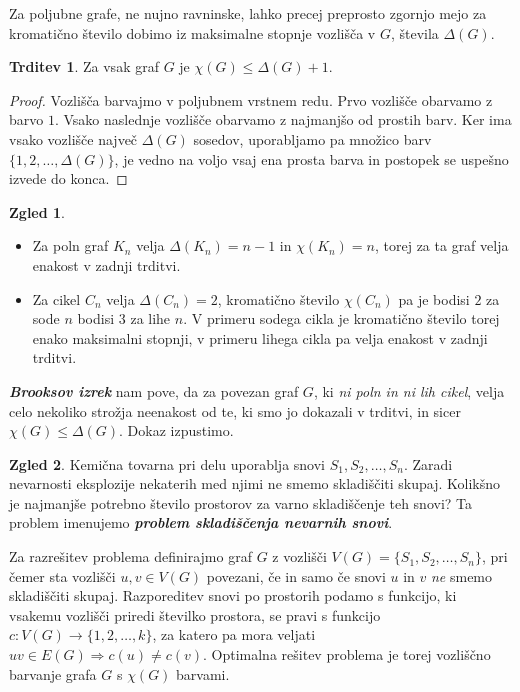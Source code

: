 \documentclass[11pt]{book}
\def\definicija{\color{rdeca}\bf\em}
\theoremstyle{definition}
\theoremstyle{zgled}
\newtheorem*{zgled}{Zgled}
\theoremstyle{odprtproblem}
\theoremstyle{domacanaloga}
\newenvironment{dokaz}
    {\color{siva}\begin{proof}}
    {\end{proof}}
\theoremstyle{izrek}
\newtheorem*{trditev}{Trditev}
\begin{document}
Za poljubne grafe, ne nujno ravninske, lahko precej preprosto zgornjo mejo za kromatično število dobimo iz maksimalne stopnje vozlišča v $G$, števila $\Delta(G)$.

\begin{trditev}
Za vsak graf $G$ je $\chi(G) \leq \Delta(G) + 1$.
\end{trditev}
\begin{dokaz}
Vozlišča barvajmo v poljubnem vrstnem redu. Prvo vozlišče obarvamo z barvo $1$. Vsako naslednje vozlišče obarvamo z najmanjšo od prostih barv. Ker ima vsako vozlišče največ $\Delta(G)$ sosedov, uporabljamo pa množico barv $\{ 1,2, \dots, \Delta(G) \}$, je vedno na voljo vsaj ena prosta barva in postopek se uspešno izvede do konca.
\end{dokaz}

\begin{zgled} \leavevmode
\begin{itemize}
    \item Za poln graf $K_n$ velja $\Delta(K_n) = n-1$ in $\chi(K_n) = n$, torej za ta graf velja enakost v zadnji trditvi.
    \item Za cikel $C_n$ velja $\Delta(C_n) = 2$, kromatično število $\chi(C_n)$ pa je bodisi $2$ za sode $n$ bodisi $3$ za lihe $n$. V primeru sodega cikla je kromatično število torej enako maksimalni stopnji, v primeru lihega cikla pa velja enakost v zadnji trditvi.
\end{itemize}
\end{zgled}

{\definicija Brooksov izrek} nam pove, da za povezan graf $G$, ki \emph{ni poln in ni lih cikel}, velja celo nekoliko strožja neenakost od te, ki smo jo dokazali v trditvi, in sicer $\chi(G) \leq \Delta(G)$. Dokaz izpustimo. 

\begin{zgled}
Kemična tovarna pri delu uporablja snovi $S_1, S_2, \dots, S_n$. Zaradi nevarnosti eksplozije nekaterih med njimi ne smemo skladiščiti skupaj. Kolikšno je najmanjše potrebno število prostorov za varno skladiščenje teh snovi? Ta problem imenujemo {\definicija problem skladiščenja nevarnih snovi}.

Za razrešitev problema definirajmo graf $G$ z vozlišči $V(G) = \{ S_1, S_2, \dots, S_n \}$, pri čemer sta vozlišči $u,v \in V(G)$ povezani, če in samo če snovi $u$ in $v$ \emph{ne} smemo skladiščiti skupaj. Razporeditev snovi po prostorih podamo s funkcijo, ki vsakemu vozlišči priredi številko prostora, se pravi s funkcijo $c \colon V(G) \to \{ 1, 2, \dots, k \}$, za katero pa mora veljati $uv \in E(G) \Rightarrow c(u) \neq c(v)$. Optimalna rešitev problema je torej vozliščno barvanje grafa $G$ s $\chi(G)$ barvami.
\end{zgled}
\end{document}
